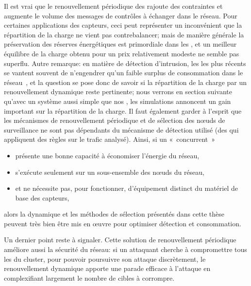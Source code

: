 Il est vrai que le renouvellement périodique des \cns rajoute des contraintes et augmente le volume des messages de contrôles à échanger dans le réseau.
Pour certaines applications des capteurs, ceci peut représenter un inconvénient que la répartition de la charge ne vient pas contrebalancer; mais de manière générale la préservation des réserves énergétiques est primordiale dans les \rcs, et un meilleur équilibre de la charge obtenu pour un prix relativement modeste ne semble pas superflu.
Autre remarque: en matière de détection d'intrusion, les \IDS les plus récents se vantent souvent de n'engendrer qu'un faible surplus de consommation dans le réseau~\cite{LZYP08}, et la question se pose donc de savoir si la répartition de la charge par un renouvellement dynamique reste pertinente; nous verrons en section suivante qu'avec un système aussi simple que nos \cns, les simulations annoncent un gain important sur la répartition de la charge.
Il faut également garder à l'esprit que les mécanismes de renouvellement périodique et de sélection des nœuds de surveillance ne sont pas dépendants du mécanisme de détection utilisé (\cad des \cns qui appliquent des règles sur le trafic analysé).
Ainsi, si un \IDS « concurrent »
\begin{itemize}
    \item présente une bonne capacité à économiser l'énergie du réseau,
    \item s'exécute seulement sur un sous-ensemble des nœuds du réseau,
    \item et ne nécessite pas, pour fonctionner, d'équipement distinct du matériel de base des capteurs,
\end{itemize}
alors la dynamique et les méthodes de sélection présentés dans cette thèse peuvent très bien être mis en œuvre pour optimiser détection et consommation.

Un dernier point reste à signaler.
Cette solution de renouvellement périodique améliore aussi la sécurité du réseau: si un attaquant cherche à compromettre tous les \cns du cluster, pour pouvoir poursuivre son attaque discrètement, le renouvellement dynamique apporte une parade efficace à l'attaque en complexifiant largement le nombre de cibles à corrompre.

